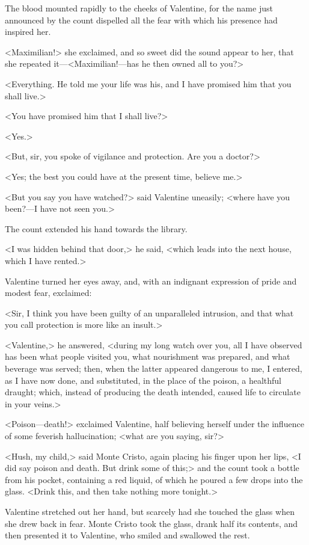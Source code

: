  The blood mounted rapidly to the cheeks of Valentine, for the name just announced by the count dispelled all the fear with which his presence had inspired her. 

 <Maximilian!> she exclaimed, and so sweet did the sound appear to her, that she repeated it—<Maximilian!—has he then owned all to you?> 

 <Everything. He told me your life was his, and I have promised him that you shall live.> 

 <You have promised him that I shall live?> 

 <Yes.> 

 <But, sir, you spoke of vigilance and protection. Are you a doctor?> 

 <Yes; the best you could have at the present time, believe me.> 

 <But you say you have watched?> said Valentine uneasily; <where have you been?—I have not seen you.> 

 The count extended his hand towards the library. 

 <I was hidden behind that door,> he said, <which leads into the next house, which I have rented.> 

 Valentine turned her eyes away, and, with an indignant expression of pride and modest fear, exclaimed: 

 <Sir, I think you have been guilty of an unparalleled intrusion, and that what you call protection is more like an insult.> 

 <Valentine,> he answered, <during my long watch over you, all I have observed has been what people visited you, what nourishment was prepared, and what beverage was served; then, when the latter appeared dangerous to me, I entered, as I have now done, and substituted, in the place of the poison, a healthful draught; which, instead of producing the death intended, caused life to circulate in your veins.> 

 <Poison—death!> exclaimed Valentine, half believing herself under the influence of some feverish hallucination; <what are you saying, sir?>

<Hush, my child,> said Monte Cristo, again placing his finger upon her lips, <I did say poison and death. But drink some of this;> and the count took a bottle from his pocket, containing a red liquid, of which he poured a few drops into the glass. <Drink this, and then take nothing more tonight.> 

 Valentine stretched out her hand, but scarcely had she touched the glass when she drew back in fear. Monte Cristo took the glass, drank half its contents, and then presented it to Valentine, who smiled and swallowed the rest. 

